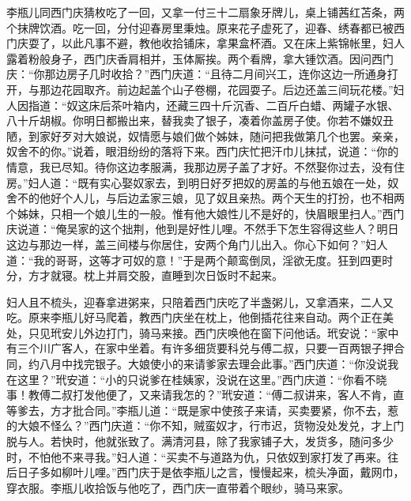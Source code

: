 李瓶儿同西门庆猜枚吃了一回，又拿一付三十二扇象牙牌儿，桌上铺茜红苫条，两个抹牌饮酒。吃一回，分付迎春房里秉烛。原来花子虚死了，迎春、绣春都已被西门庆耍了，以此凡事不避，教他收拾铺床，拿果盒杯酒。又在床上紫锦帐里，妇人露着粉般身子，西门庆香肩相并，玉体厮挨。两个看牌，拿大锺饮酒。因问西门庆：“你那边房子几时收拾？”西门庆道：“且待二月间兴工，连你这边一所通身打开，与那边花园取齐。前边起盖个山子卷棚，花园耍子。后边还盖三间玩花楼。”妇人因指道：“奴这床后茶叶箱内，还藏三四十斤沉香、二百斤白蜡、两罐子水银、八十斤胡椒。你明日都搬出来，替我卖了银子，凑着你盖房子使。你若不嫌奴丑陋，到家好歹对大娘说，奴情愿与娘们做个姊妹，随问把我做第几个也罢。亲亲，奴舍不的你。”说着，眼泪纷纷的落将下来。西门庆忙把汗巾儿抹拭，说道：“你的情意，我已尽知。待你这边孝服满，我那边房子盖了才好。不然娶你过去，没有住房。”妇人道：“既有实心娶奴家去，到明日好歹把奴的房盖的与他五娘在一处，奴舍不的他好个人儿，与后边孟家三娘，见了奴且亲热。两个天生的打扮，也不相两个姊妹，只相一个娘儿生的一般。惟有他大娘性儿不是好的，快眉眼里扫人。”西门庆说道：“俺吴家的这个拙荆，他到是好性儿哩。不然手下怎生容得这些人？明日这边与那边一样，盖三间楼与你居住，安两个角门儿出入。你心下如何？”妇人道：“我的哥哥，这等才可奴的意！”于是两个颠鸾倒凤，淫欲无度。狂到四更时分，方才就寝。枕上并肩交股，直睡到次日饭时不起来。

妇人且不梳头，迎春拿进粥来，只陪着西门庆吃了半盏粥儿，又拿酒来，二人又吃。原来李瓶儿好马爬着，教西门庆坐在枕上，他倒插花往来自动。两个正在美处，只见玳安儿外边打门，骑马来接。西门庆唤他在窗下问他话。玳安说：“家中有三个川广客人，在家中坐着。有许多细货要科兑与傅二叔，只要一百两银子押合同，约八月中找完银子。大娘使小的来请爹家去理会此事。”西门庆道：“你没说我在这里？”玳安道：“小的只说爹在桂姨家，没说在这里。”西门庆道：“你看不晓事！教傅二叔打发他便了，又来请我怎的？”玳安道：“傅二叔讲来，客人不肯，直等爹去，方才批合同。”李瓶儿道：“既是家中使孩子来请，买卖要紧，你不去，惹的大娘不怪么？”西门庆道：“你不知，贼蛮奴才，行市迟，货物没处发兑，才上门脱与人。若快时，他就张致了。满清河县，除了我家铺子大，发货多，随问多少时，不怕他不来寻我。”妇人道：“买卖不与道路为仇，只依奴到家打发了再来。往后日子多如柳叶儿哩。”西门庆于是依李瓶儿之言，慢慢起来，梳头净面，戴网巾，穿衣服。李瓶儿收拾饭与他吃了，西门庆一直带着个眼纱，骑马来家。


